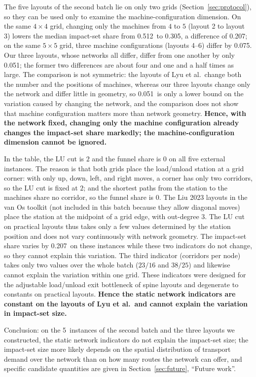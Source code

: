 \documentclass[manuscript,screen,review]{acmart}
\newcommand{\NPubInst}{5}
\newcommand{\PubCloLo}{0.305}
\newcommand{\PubCloHi}{0.512}
\newcommand{\PubCloSpread}{0.207}
\newcommand{\PubCloSpreadBig}{0.075}
\newcommand{\SelfCloSpread}{0.051}
\begin{document}
The five layouts of the second batch lie on only two grids (Section~\ref{sec:protocol}), so they can be used only to examine the machine-configuration dimension.
On the same \(4\times 4\) grid, changing only the machines from \(4\) to \(5\) (layout 2 to layout 3) lowers the median impact-set share from \PubCloHi\ to \PubCloLo, a difference of \PubCloSpread;
on the same \(5\times 5\) grid, three machine configurations (layouts 4--6) differ by \PubCloSpreadBig.
Our three layouts, whose networks all differ, differ from one another by only \SelfCloSpread; the former two differences are about four and one and a half times as large.
The comparison is not symmetric: the layouts of Lyu et al.\ change both the number and the positions of machines, whereas our three layouts change only the network and differ little in geometry,
so \SelfCloSpread\ is only a lower bound on the variation caused by changing the network, and the comparison does not show that machine configuration matters more than network geometry.
\textbf{Hence, with the network fixed, changing only the machine configuration already changes the impact-set share markedly; the machine-configuration dimension cannot be ignored.}

In the table, the LU cut is \(2\) and the funnel share is \(0\) on all five external instances.
The reason is that both grids place the load/unload station at a grid corner: with only up, down, left, and right moves, a corner has only two corridors, so the LU cut is fixed at \(2\);
and the shortest paths from the station to the machines share no corridor, so the funnel share is \(0\).
The Liu 2023 layouts in the van Os toolkit (not included in this batch because they allow diagonal moves) place the station at the midpoint of a grid edge, with out-degree \(3\).
The LU cut on practical layouts thus takes only a few values determined by the station position and does not vary continuously with network geometry.
The impact-set share varies by \PubCloSpread\ on these instances while these two indicators do not change, so they cannot explain this variation.
The third indicator (corridors per node) takes only two values over the whole batch (\(23/16\) and \(38/25\)) and likewise cannot explain the variation within one grid.
These indicators were designed for the adjustable load/unload exit bottleneck of spine layouts and degenerate to constants on practical layouts.
\textbf{Hence the static network indicators are constant on the layouts of Lyu et al.\ and cannot explain the variation in impact-set size.}

Conclusion: on the \NPubInst\ instances of the second batch and the three layouts we constructed, the static network indicators do not explain the impact-set size;
the impact-set size more likely depends on the spatial distribution of transport demand over the network than on how many routes the network can offer,
and specific candidate quantities are given in Section~\ref{sec:future}, ``Future work''.
\end{document}

